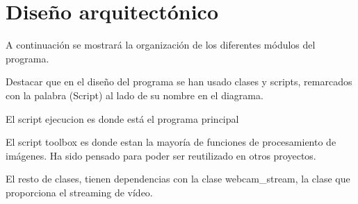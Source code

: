 


\section{Diseño arquitectónico}
A continuación se mostrará la organización de los diferentes módulos del programa.

Destacar que en el diseño del programa se han usado clases y scripts, remarcados con la palabra (Script) al lado de su nombre en el diagrama.

El script ejecucion es donde está el programa principal

El script toolbox es donde estan la mayoría de funciones de procesamiento de imágenes. Ha sido pensado para poder ser reutilizado en otros proyectos.

El resto de clases, tienen dependencias con la clase webcam\_stream, la clase que proporciona el streaming de vídeo.




